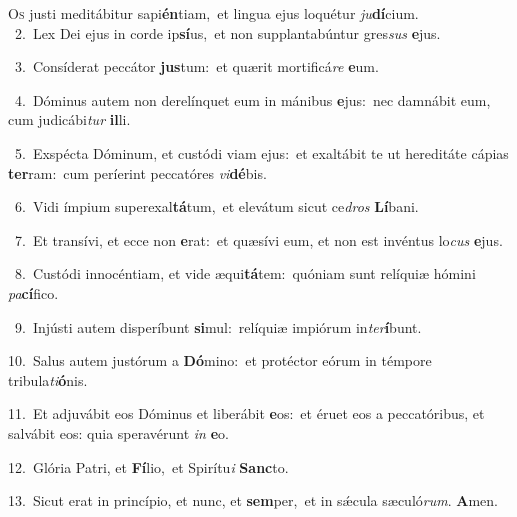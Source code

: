 \lettrine{\initial\textcolor{\initialcolor}{O}}{s} justi meditábitur sapi\-\textbf{én}\-tiam,~\star et lingua ejus loquétur \textit{ju}\-\textbf{dí}cium.\\
{\numbfont\textcolor{\numbcolor}{~2.}}~Lex Dei ejus in corde ip\-\textbf{sí}\-us,~\star et non supplantabúntur gres\textit{sus} \textbf{e}\-jus.\par
{\numbfont\textcolor{\numbcolor}{~3.}}~Consíderat peccátor \textbf{jus}\-tum:~\star et quærit mortificá\textit{re} \textbf{e}\-um.\par
{\numbfont\textcolor{\numbcolor}{~4.}}~Dóminus autem non derelínquet eum in mánibus \textbf{e}\-jus:~\star nec damnábit eum, cum judicábi\textit{tur} \textbf{il}\-li.\par
{\numbfont\textcolor{\numbcolor}{~5.}}~Exspécta Dóminum, et custódi viam ejus:~\dagger et exaltábit te ut hereditáte cápias \textbf{ter}\-ram:~\star cum períerint peccatóres \textit{vi}\-\textbf{dé}bis.\par
{\numbfont\textcolor{\numbcolor}{~6.}}~Vidi ímpium superexal\-\textbf{tá}\-tum,~\star et elevátum sicut ce\textit{dros} \textbf{Lí}\-bani.\par
{\numbfont\textcolor{\numbcolor}{~7.}}~Et transívi, et ecce non \textbf{e}\-rat:~\star et quæsívi eum, et non est invéntus lo\textit{cus} \textbf{e}\-jus.\par
{\numbfont\textcolor{\numbcolor}{~8.}}~Custódi innocéntiam, et vide æqui\-\textbf{tá}\-tem:~\star quóniam sunt relíquiæ hómini \textit{pa}\-\textbf{cí}fico.\par
{\numbfont\textcolor{\numbcolor}{~9.}}~Injústi autem disperíbunt \textbf{si}\-mul:~\star relíquiæ impiórum in\-\textit{ter}\-\textbf{í}bunt.\par
{\numbfont\textcolor{\numbcolor}{10.}}~Salus autem justórum a \textbf{Dó}\-mino:~\star et protéctor eórum in témpore tribula\-\textit{ti}\-\textbf{ó}nis.\par
{\numbfont\textcolor{\numbcolor}{11.}}~Et adjuvábit eos Dóminus et liberábit \textbf{e}\-os:~\star et éruet eos a peccatóribus, et salvábit eos: quia speravérunt \textit{in} \textbf{e}\-o.\par
{\numbfont\textcolor{\numbcolor}{12.}}~Glória Patri, et \textbf{Fí}\-lio,~\star et Spirítu\textit{i} \textbf{Sanc}\-to.\par
{\numbfont\textcolor{\numbcolor}{13.}}~Sicut erat in princípio, et nunc, et \textbf{sem}\-per,~\star et in sǽcula sæculó\-\textit{rum}\-. \textbf{A}\-men.\par
